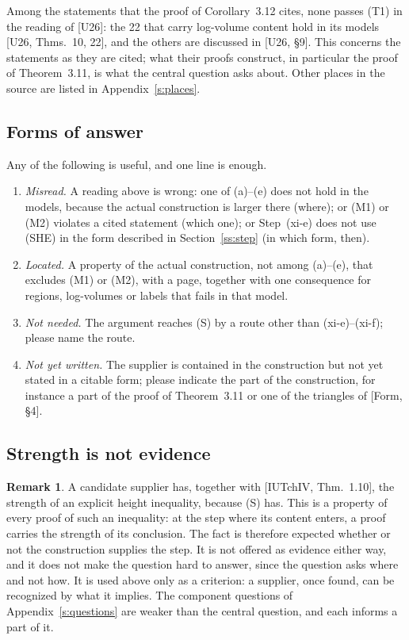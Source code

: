 \documentclass[11pt]{article}
\theoremstyle{definition}
\newtheorem{remark}{Remark}
\begin{document}
Among the statements that the proof of Corollary~3.12 cites, none
passes (T1) in the reading of [U26]: the 22 that carry log-volume
content hold in its models [U26, Thms.~10, 22], and the others are
discussed in [U26, \S9].  This concerns the statements as they are
cited; what their proofs construct, in particular the proof of
Theorem~3.11, is what the central question asks about.
Other places in the source are listed in Appendix~\ref{s:places}.

\subsection{Forms of answer}\label{ss:answers}

Any of the following is useful, and one line is enough.
\begin{enumerate}[label=(\Alph*),leftmargin=*]
\item \emph{Misread.}  A reading above is wrong: one of (a)--(e)
does not hold in the models, because the actual construction is
larger there (where); or (M1) or (M2) violates a cited statement
(which one); or Step~(xi-e) does not use (SHE) in the form described
in Section~\ref{ss:step} (in which form, then).
\item \emph{Located.}  A property of the actual construction, not
among (a)--(e), that excludes (M1) or (M2), with a page, together
with one consequence for regions, log-volumes or labels that fails
in that model.
\item \emph{Not needed.}  The argument reaches (S) by a route other
than (xi-e)--(xi-f); please name the route.
\item \emph{Not yet written.}  The supplier is contained in the
construction but not yet stated in a citable form; please indicate
the part of the construction, for instance a part of the proof of
Theorem~3.11 or one of the triangles of [Form, \S4].
\end{enumerate}

\subsection{Strength is not evidence}\label{ss:strength}

\begin{remark}\label{r:strength}
A candidate supplier has, together with [IUTchIV, Thm.~1.10], the
strength of an explicit height inequality, because (S) has.  This
is a property of every proof of such an inequality: at the step
where its content enters, a proof carries the strength of its
conclusion.  The fact is therefore expected whether or not the
construction supplies the step.  It is not offered as evidence
either way, and it does not make the question hard to answer, since
the question asks where and not how.  It is used above only as a
criterion: a supplier, once found, can be recognized by what it
implies.  The component questions of Appendix~\ref{s:questions} are
weaker than the central question, and each informs a part of it.
\end{remark}
\end{document}

